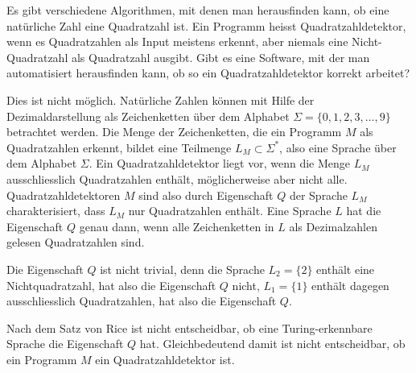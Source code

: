 Es gibt verschiedene Algorithmen, mit denen man herausfinden kann, ob
eine natürliche Zahl eine Quadratzahl ist.
Ein Programm heisst Quadratzahldetektor, wenn es Quadratzahlen
als Input meistens erkennt, aber niemals eine Nicht-Qua\-dratzahl
als Quadratzahl ausgibt. Gibt es eine Software, mit der man automatisiert
herausfinden kann, ob so ein Quadratzahldetektor korrekt arbeitet?

\begin{loesung}
Dies ist nicht möglich. 
Natürliche Zahlen können mit Hilfe der Dezimaldarstellung als 
Zeichenketten über dem Alphabet $\Sigma=\{0,1,2,3,\dots,9\}$
betrachtet werden.
Die Menge der Zeichenketten, die ein Programm $M$ als Quadratzahlen
erkennt, bildet eine Teilmenge $L_M\subset\Sigma^*$, also eine Sprache
über dem Alphabet $\Sigma$. Ein Quadratzahldetektor liegt vor, wenn
die Menge $L_M$ ausschliesslich Quadratzahlen enthält, möglicherweise
aber nicht alle. Quadratzahldetektoren $M$ sind also durch Eigenschaft
$Q$ der Sprache $L_M$ charakterisiert, dass $L_M$ nur Quadratzahlen
enthält. Eine Sprache $L$ hat die Eigenschaft $Q$ genau dann, wenn
alle Zeichenketten in $L$ als Dezimalzahlen gelesen Quadratzahlen sind.

Die Eigenschaft $Q$ ist nicht trivial, denn die Sprache 
$L_2=\{2\}$ enthält eine Nichtquadratzahl, hat also die Eigenschaft $Q$
nicht, $L_1=\{1\}$ enthält dagegen aus\-schliess\-lich Quadratzahlen, hat
also die Eigenschaft $Q$.

Nach dem Satz von Rice ist nicht entscheidbar, ob eine Turing-erkennbare
Sprache die Eigenschaft $Q$ hat. Gleichbedeutend damit ist
nicht entscheidbar, ob ein Programm $M$ ein Quadratzahldetektor ist.
\end{loesung}
